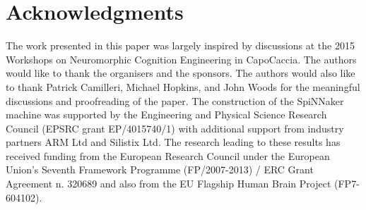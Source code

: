 \documentclass{frontiersENG} %
\begin{document}
\section*{Acknowledgments}

The work presented in this paper was largely inspired by discussions at the 2015 Workshops on Neuromorphic Cognition Engineering in CapoCaccia.
The authors would like to thank the organisers and the sponsors.
The authors would also like to thank Patrick Camilleri, Michael Hopkins, and John Woods for the meaningful discussions and proofreading of the paper.
The construction of the SpiNNaker machine was supported by the Engineering and Physical Science Research Council (EPSRC grant EP/4015740/1) with additional support from industry partners ARM Ltd and Silistix Ltd.
The research leading to these results has received funding from the European Research Council under the European Union's Seventh Framework Programme (FP/2007-2013) / ERC Grant Agreement n. 320689 and also from the EU Flagship Human Brain Project (FP7-604102). 



%
\end{document}
